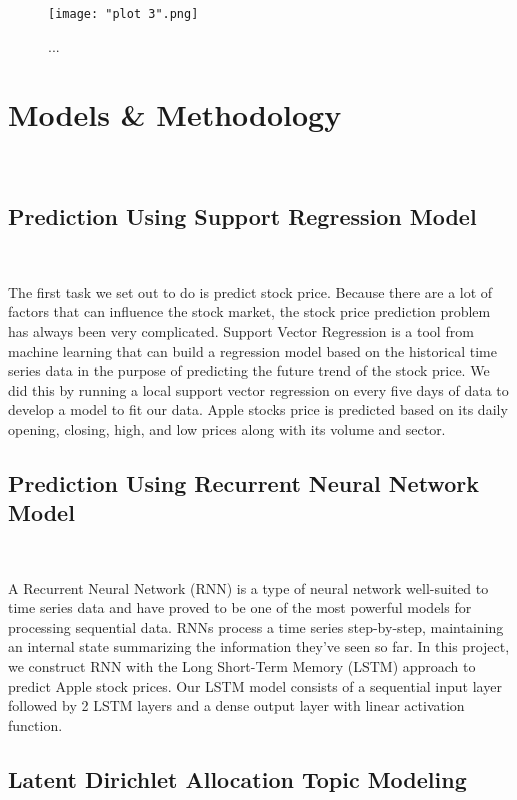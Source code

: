 \documentclass[11pt, oneside]{article}   	%
\begin{document}
\begin{figure}[!h] %
   \centering
   \texttt{[image: "plot 3".png]} 
   \caption{...}
   \label{fig:example}
\end{figure} 

\FloatBarrier





\section{Models \& Methodology} \

\subsection{Prediction Using Support Regression Model} \

The first task we set out to do is predict stock price. Because there are a lot of factors that can influence the stock market, the stock price prediction problem has always been very complicated. Support Vector Regression is a tool from machine learning that can build a regression model based on the historical time series data in the purpose of predicting the future trend of the stock price. We did this by running a local support vector regression on every five days of data to develop a model to fit our data. Apple stocks price is predicted based on its daily opening, closing, high, and low prices along with its volume and sector. 

\subsection{Prediction Using Recurrent Neural Network Model} \

A Recurrent Neural Network (RNN) is a type of neural network well-suited to time series data and have proved to be one of the most powerful models for processing sequential data. RNNs process a time series step-by-step, maintaining an internal state summarizing the information they've seen so far. In this project, we construct RNN with the Long Short-Term Memory (LSTM) approach to predict Apple stock prices. Our LSTM model consists of a sequential input layer followed by 2 LSTM layers and a dense output layer with linear activation function.

\subsection{Latent Dirichlet Allocation Topic Modeling} \
\end{document}

